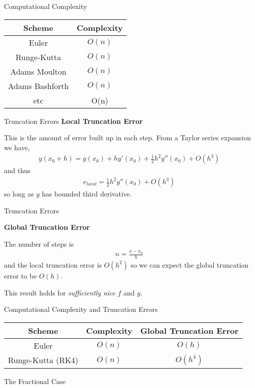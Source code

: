\documentclass[pdf]{beamer}
\begin{document}
\begin{frame}{Computational Complexity}
    \begin{tabular}{|c|c|}
        \hline
        Scheme & Complexity \\
        \hline
        Euler & $O(n)$ \\
        Runge-Kutta &$ O(n)$ \\
        Adams Moulton &$ O(n)$ \\
        Adams Bashforth &$ O(n)$ \\
        etc & O(n) \\
        \hline
    \end{tabular}
\end{frame}

\begin{frame}{Truncation Errors}
    \textbf{Local Truncation Error}
    
    This is the amount of error built up in each step.
    From a Taylor series expansion we have,
    \begin{align*}
        y(x_0 + h) = y(x_0) + hy'(x_0) + \frac{1}{2}h^2y''(x_0) + O(h^3)
    \end{align*}
    and thus
    \begin{align*}
        e_{local} = \frac{1}{2}h^2y''(x_0) + O(h^3)
    \end{align*}
    so long as $ y $ has bounded third derivative.
\end{frame}

\begin{frame}{Truncation Errors}
    
    \textbf{Global Truncation Error}
    
    The number of steps is 
    \begin{align*}
        n = \frac{x - x_0}{h}
    \end{align*}
    and the local truncation error is $ O(h^2) $ so we can expect
    the global truncation error to be $ O(h) $. 
    
    This result holds for \emph{sufficiently nice} $ f $ and $ y $.
    
\end{frame}

\begin{frame}{Computational Complexity and Truncation Errors}
    \begin{tabular}{|c|c|c|}
        \hline
        Scheme & Complexity & Global Truncation Error \\
        \hline
        Euler & $O(n)$ & $ O(h) $ \\
        Runge-Kutta (RK4) & $O(n)$ & $O(h^4)$ \\
        \hline
    \end{tabular}
\end{frame}

\begin{frame}{The Fractional Case}
    
\end{frame}
\end{document}
